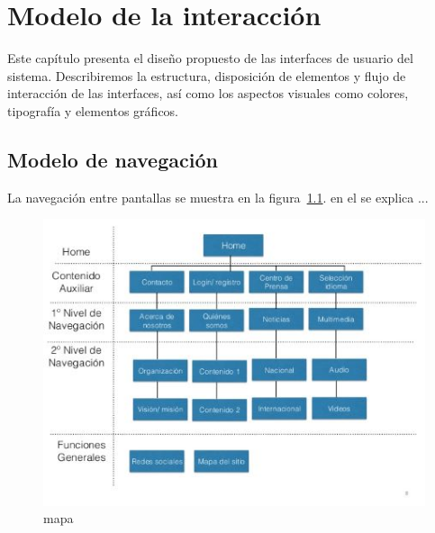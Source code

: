 \chapter{Modelo de la interacción}	
\label{cap:modInteraccion}

	Este capítulo presenta el diseño propuesto de las interfaces de usuario del sistema. Describiremos la estructura, disposición de elementos y flujo de interacción de las interfaces, así como los aspectos visuales como colores, tipografía y elementos gráficos.

\section{Modelo de navegación}

	La navegación entre pantallas se muestra en la figura~\ref{fig:mapa}. en el se explica ...

\begin{figure}[htbp]
	\begin{center}
		\includegraphics[width=.5\textwidth]{images/mapa}
		\caption{mapa}
		\label{fig:mapa}
	\end{center}
\end{figure}

























